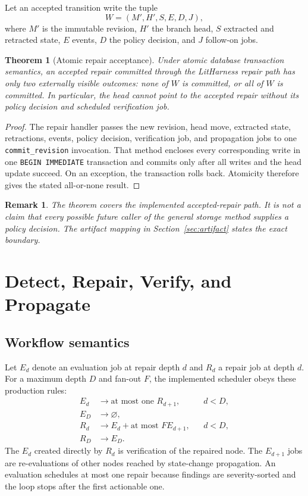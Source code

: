 \documentclass[11pt]{article}
\newtheorem{theorem}[definition]{Theorem}
\newtheorem{remark}[definition]{Remark}
\newcommand{\code}[1]{\texttt{#1}}
\begin{document}
Let an accepted transition write the tuple
\[
 W=(M',H',S,E,D,J),
\]
where $M'$ is the immutable revision, $H'$ the branch head, $S$ extracted and retracted
state, $E$ events, $D$ the policy decision, and $J$ follow-on jobs.

\begin{theorem}[Atomic repair acceptance]
\label{thm:atomic}
Under atomic database transaction semantics, an accepted repair committed through the
LitHarness repair path has only two externally visible outcomes: none of $W$ is committed,
or all of $W$ is committed. In particular, the head cannot point to the accepted repair
without its policy decision and scheduled verification job.
\end{theorem}

\begin{proof}
The repair handler passes the new revision, head move, extracted state, retractions, events,
policy decision, verification job, and propagation jobs to one \code{commit\_revision}
invocation. That method encloses every corresponding write in one \code{BEGIN IMMEDIATE}
transaction and commits only after all writes and the head update succeed. On an exception,
the transaction rolls back. Atomicity therefore gives the stated all-or-none result.
\end{proof}

\begin{remark}
The theorem covers the implemented accepted-repair path. It is not a claim that every
possible future caller of the general storage method supplies a policy decision. The
artifact mapping in Section~\ref{sec:artifact} states the exact boundary.
\end{remark}

\section{Detect, Repair, Verify, and Propagate}

\subsection{Workflow semantics}

Let $E_d$ denote an evaluation job at repair depth $d$ and $R_d$ a repair job at depth $d$.
For a maximum depth $D$ and fan-out $F$, the implemented scheduler obeys these production
rules:
\[
\begin{aligned}
  E_d &\longrightarrow \text{at most one }R_{d+1}, && d<D,\\
  E_D &\longrightarrow \varnothing,\\
  R_d &\longrightarrow E_d + \text{at most }F E_{d+1}, && d<D,\\
  R_D &\longrightarrow E_D.
\end{aligned}
\]
The $E_d$ created directly by $R_d$ is verification of the repaired node. The $E_{d+1}$
jobs are re-evaluations of other nodes reached by state-change propagation. An evaluation
schedules at most one repair because findings are severity-sorted and the loop stops after
the first actionable one.
\end{document}
